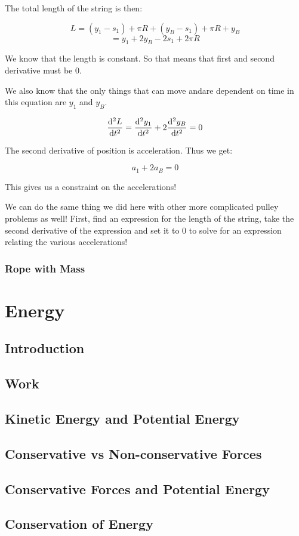 \documentclass{report}
\begin{document}
The total length of the string is then:

$$L = (y_1 - s_1) + \pi R + (y_B-s_1)+\pi R + y_B$$
$$=y_1+2y_B-2s_1+2\pi R$$

We know that the length is constant. So that means that first and second derivative must be 0.

We also know that the only things that can move andare dependent on time in this equation are $y_1$ and $y_B$.

$$\dv[2]{L}{t} = \dv[2]{y_1}{t} + 2\dv[2]{y_B}{t} = 0$$

The second derivative of position is acceleration. Thus we get:


$$
\boxed{
a_1 + 2a_B = 0
}
$$

This gives us a constraint on the accelerations!

We can do the same thing we did here with other more complicated pulley problems as well! First, find an expression for the length of the string, take the second derivative of the expression and set it to 0 to solve for an expression relating the various accelerations!

\subsection{Rope with Mass}



\chapter{Energy}
\section{Introduction}
\section{Work}
\section{Kinetic Energy and Potential Energy}
\section{Conservative vs Non-conservative Forces}
\section{Conservative Forces and Potential Energy}
\section{Conservation of Energy}
\end{document}
